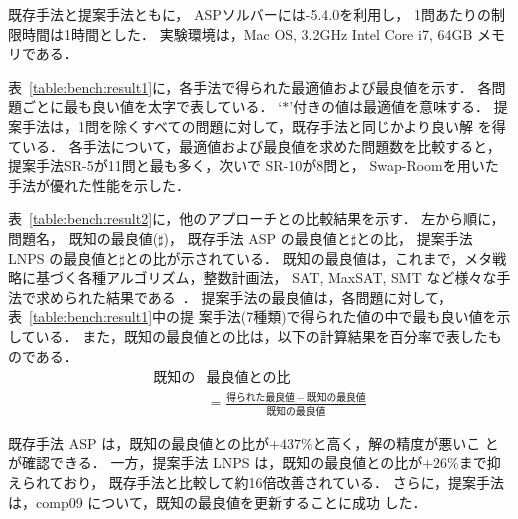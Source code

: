 既存手法と提案手法ともに，
ASPソルバーには{\clingo}-5.4.0を利用し，
1問あたりの制限時間は1時間とした．
実験環境は，Mac OS, 3.2GHz Intel Core i7, 64GB メモリである．

表~\ref{table:bench:result1}に，各手法で得られた最適値および最良値を示す．
各問題ごとに最も良い値を太字で表している．
`$\ast$'付きの値は最適値を意味する．
提案手法は，1問を除くすべての問題に対して，既存手法と同じかより良い解
を得ている．
各手法について，最適値および最良値を求めた問題数を比較すると，
提案手法\textsf{SR-5}が11問と最も多く，次いで
\textsf{SR-10}が8問と，
\textsf{Swap-Room}を用いた手法が優れた性能を示した．


表~\ref{table:bench:result2}に，他のアプローチとの比較結果を示す．
左から順に，
問題名，
既知の最良値($\sharp$)，
既存手法 ASP の最良値と$\sharp$との比，
提案手法 LNPS の最良値と$\sharp$との比が示されている．
既知の最良値は，これまで，メタ戦略に基づく各種アルゴリズム，整数計画法，
SAT, MaxSAT, SMT など様々な手法で求められた結果である~\cite{anor/Banbara2019}．
提案手法の最良値は，各問題に対して，表~\ref{table:bench:result1}中の提
案手法(7種類)で得られた値の中で最も良い値を示している．
また，既知の最良値との比は，以下の計算結果を百分率で表したものである．
\begin{align*}
既知の&最良値との比\\
&= \frac{得られた最良値 - 既知の最良値}{既知の最良値}
\end{align*}

既存手法 ASP は，既知の最良値との比が$+437\%$と高く，解の精度が悪いこ
とが確認できる．
一方，提案手法 LNPS は，既知の最良値との比が$+26\%$まで抑えられており，
既存手法と比較して約16倍改善されている．
さらに，提案手法は，comp09 について，既知の最良値を更新することに成功
した．

